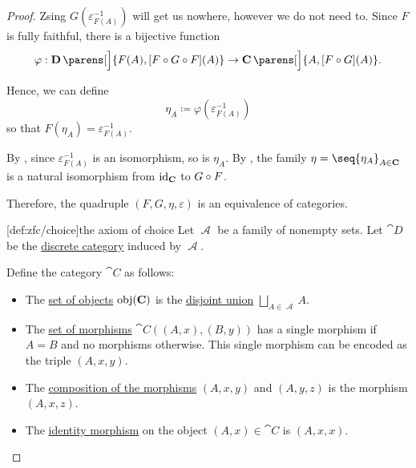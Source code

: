\begin{proof}
  Zsing \( G(\varepsilon_{F(A)}^{-1}) \) will get us nowhere, however we do not need to. Since \( F \) is fully faithful, there is a bijective function
  \begin{equation*}
    \varphi: \cat{D}\parens[\Big]{ F(A), [F \bincirc G \bincirc F](A) } \to \cat{C}\parens[\Big]{ A, [F \bincirc G](A) }.
  \end{equation*}

  Hence, we can define
  \begin{equation*}
    \eta_A \coloneqq \varphi(\varepsilon_{F(A)}^{-1})
  \end{equation*}
  so that \( F(\eta_A) = \varepsilon_{F(A)}^{-1} \).

  By , since \( \varepsilon_{F(A)}^{-1} \) is an isomorphism, so is \( \eta_A \). By , the family \( \eta = \seq{ \eta_A }_{A \in \cat{C}} \) is a natural isomorphism from \( \operatorname{id}_{\operatorname{\mathbf{C}}} \) to \( G \bincirc F \).

  Therefore, the quadruple \( (F, G, \eta, \varepsilon) \) is an equivalence of categories.

  [def:zfc/choice]{the axiom of choice} Let \( \mscrA \) be a family of nonempty sets. Let \( \cat{D} \) be the \hyperref[def:discrete_category]{discrete category} induced by \( \mscrA \).

  Define the category \( \cat{C} \) as follows:
  \begin{itemize}
    \item The \hyperref[def:category/objects]{set of objects} \( \operatorname{obj}(\operatorname{\mathbf{C}}) \) is the \hyperref[def:disjoint_union]{disjoint union} \( \bigsqcup_{A \in \mscrA} A \).

    \item The \hyperref[def:category/morphisms]{set of morphisms} \( \cat{C}((A, x), (B, y)) \) has a single morphism if \( A = B \) and no morphisms otherwise. This single morphism can be encoded as the triple \( (A, x, y) \).

    \item The \hyperref[def:category/composition]{composition of the morphisms} \( (A, x, y) \) and \( (A, y, z) \) is the morphism \( (A, x, z) \).

    \item The \hyperref[def:category/identity]{identity morphism} on the object \( (A, x) \in \cat{C} \) is \( (A, x, x) \).
  \end{itemize}


\end{proof}

